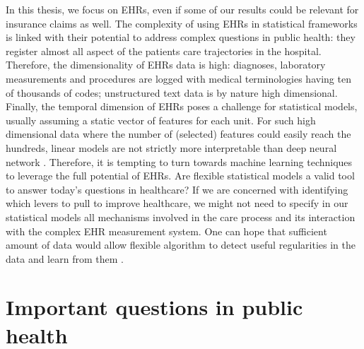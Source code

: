 \documentclass[french,12pt,twoside,a4paper]{book}
\begin{document}
In this thesis, we focus on EHRs, even if some of our results could be relevant
for insurance claims as well. The complexity of using EHRs in statistical
frameworks is linked with their potential to address complex questions in public
health: they register almost all aspect of the patients care trajectories in the
hospital. Therefore, the dimensionality of EHRs data is high: diagnoses,
laboratory measurements and procedures are logged with medical terminologies
having ten of thousands of codes; unstructured text data is by nature high
dimensional. Finally, the temporal dimension of EHRs poses a challenge for
statistical models, usually assuming a static vector of features for each unit.
For such high dimensional data where the number of (selected) features could
easily reach the hundreds, linear models are not strictly more interpretable
than deep neural network \citep{lipton2018mythos}. Therefore, it is tempting to
turn towards machine learning techniques to leverage the full potential of EHRs.
% 
Are flexible statistical models a valid tool to answer today's questions in
healthcare? If we are concerned with identifying which levers to pull to improve
healthcare, we might not need to specify in our statistical models all
mechanisms involved in the care process and its interaction with the complex EHR
measurement system. One can hope that sufficient amount of data would allow flexible algorithm to
detect useful regularities in the data and learn from them
\citep{halevy2009unreasonable}.



\section{Important questions in public health}%
\label{sec:intro:causality}%
\end{document}
